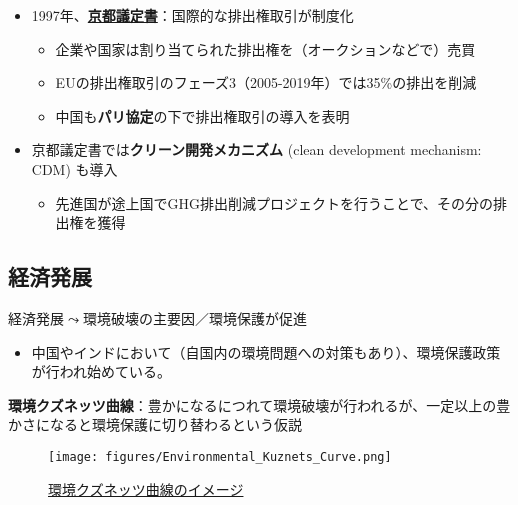 \documentclass[
  xelatex,
  ja=standard]{bxjsarticle}
\providecommand{\tightlist}{%
  \setlength{\itemsep}{0pt}\setlength{\parskip}{0pt}}\usepackage{longtable,booktabs,array}
\begin{document}
\begin{itemize}
\tightlist
\item
  1997年、\href{https://www.env.go.jp/earth/cop6/3-2.html}{\textbf{京都議定書}}：国際的な排出権取引が制度化

  \begin{itemize}
  \tightlist
  \item
    企業や国家は割り当てられた排出権を（オークションなどで）売買
  \item
    EUの排出権取引のフェーズ3（2005-2019年）では35\%の排出を削減
  \item
    中国も\textbf{パリ協定}の下で排出権取引の導入を表明
  \end{itemize}
\item
  京都議定書では\textbf{クリーン開発メカニズム} (clean development
  mechanism: CDM) も導入

  \begin{itemize}
  \tightlist
  \item
    先進国が途上国でGHG排出削減プロジェクトを行うことで、その分の排出権を獲得
  \end{itemize}
\end{itemize}

\hypertarget{ux7d4cux6e08ux767aux5c55}{%
\subsection{経済発展}\label{ux7d4cux6e08ux767aux5c55}}

経済発展\(\leadsto\)環境破壊の主要因／環境保護が促進

\begin{itemize}
\tightlist
\item
  中国やインドにおいて（自国内の環境問題への対策もあり）、環境保護政策が行われ始めている。
\end{itemize}

\textbf{環境クズネッツ曲線}：豊かになるにつれて環境破壊が行われるが、一定以上の豊かさになると環境保護に切り替わるという仮説

\begin{figure}[htpb]

{\centering \texttt{[image: figures/Environmental\_Kuznets\_Curve.png]}

}

\caption{\href{https://commons.wikimedia.org/wiki/File:Environmental_Kuznets_Curve.png}{環境クズネッツ曲線のイメージ}}

\end{figure}
\end{document}
